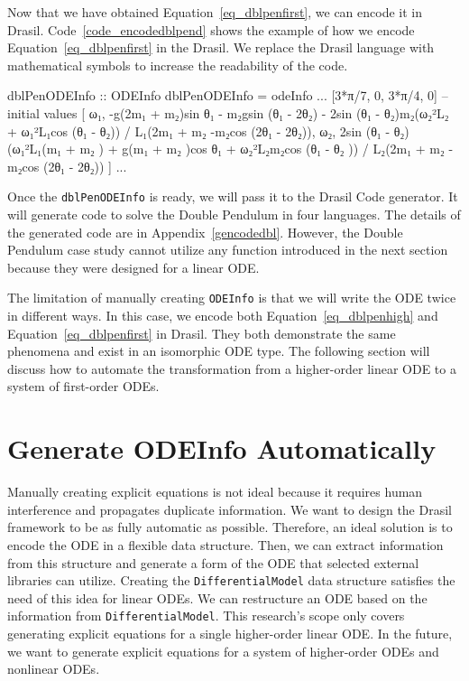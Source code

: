 Now that we have obtained Equation~\ref{eq_dblpenfirst}, we can encode it in Drasil. Code~\ref{code_encodedblpend} shows the example of how we encode Equation~\ref{eq_dblpenfirst} in the Drasil. We replace the Drasil language with mathematical symbols to increase the readability of the code.
\begin{listing}[ht]
\begin{haskell1}
dblPenODEInfo :: ODEInfo
dblPenODEInfo = odeInfo
...
[3*π/7, 0, 3*π/4, 0] -- initial values
[ ω₁,
  -g(2m₁ + m₂)sin θ₁ - m₂gsin (θ₁ - 2θ₂) - 2sin (θ₁ - θ₂)m₂(ω₂²L₂ + ω₁²L₁cos (θ₁ - θ₂)) / L₁(2m₁ + m₂ -m₂cos (2θ₁ - 2θ₂)),
  ω₂,
  2sin (θ₁ - θ₂)(ω₁²L₁(m₁ + m₂ ) + g(m₁ + m₂ )cos θ₁ + ω₂²L₂m₂cos (θ₁ - θ₂ )) / L₂(2m₁ + m₂ -m₂cos (2θ₁ - 2θ₂))
]
...
\end{haskell1}
\label{code_encodedblpend}
\end{listing}

Once the \verb|dblPenODEInfo| is ready, we will pass it to the Drasil Code generator. It will generate code to solve the Double Pendulum in four languages. The details of the generated code are in Appendix~\ref{gencodedbl}. However, the Double Pendulum case study cannot utilize any function introduced in the next section because they were designed for a linear ODE.

The limitation of manually creating \verb|ODEInfo| is that we will write the ODE twice in different ways. In this case, we encode both Equation~\ref{eq_dblpenhigh} and Equation~\ref{eq_dblpenfirst} in Drasil. They both demonstrate the same phenomena and exist in an isomorphic ODE type. The following section will discuss how to automate the transformation from a higher-order linear ODE to a system of first-order ODEs.

\section{Generate ODEInfo Automatically}
Manually creating explicit equations is not ideal because it requires human interference and propagates duplicate information. We want to design the Drasil framework to be as fully automatic as possible. Therefore, an ideal solution is to encode the ODE in a flexible data structure. Then, we can extract information from this structure and generate a form of the ODE that selected external libraries can utilize. Creating the \verb|DifferentialModel| data structure satisfies the need of this idea for linear ODEs. We can restructure an ODE based on the information from \verb|DifferentialModel|. This research's scope only covers generating explicit equations for a single higher-order linear ODE. In the future, we want to generate explicit equations for a system of higher-order ODEs and nonlinear ODEs.

